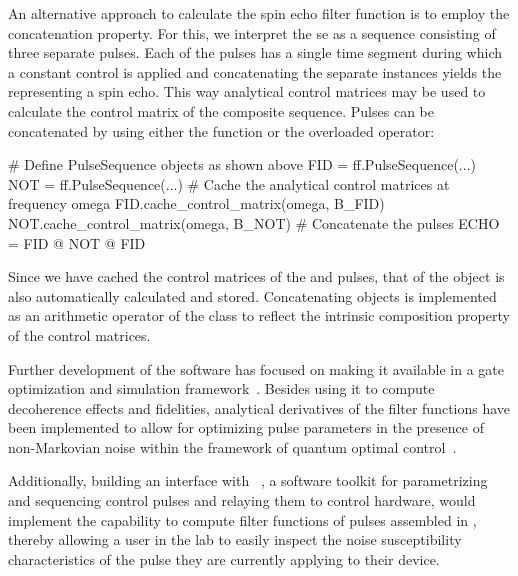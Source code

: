 An alternative approach to calculate the spin echo filter function is to employ the concatenation property.
For this, we interpret the \gls{se} as a sequence consisting of three separate pulses.
Each of the pulses has a single time segment during which a constant control is applied and concatenating the separate \pulsesequence instances yields the \pulsesequence representing a spin echo.
This way analytical control matrices may be used to calculate the control matrix of the composite sequence.
Pulses can be concatenated by using either the  function or the overloaded  operator:
\begin{pycode}
    # Define PulseSequence objects as shown above
    FID = ff.PulseSequence(...)
    NOT = ff.PulseSequence(...)
    # Cache the analytical control matrices at frequency omega
    FID.cache_control_matrix(omega, B_FID)
    NOT.cache_control_matrix(omega, B_NOT)
    # Concatenate the pulses
    ECHO = FID @ NOT @ FID
\end{pycode}
Since we have cached the control matrices of the  and  pulses, that of the  object is also automatically calculated and stored.
Concatenating \pulsesequence objects is implemented as an arithmetic operator of the class to reflect the intrinsic composition property of the control matrices.

Further development of the software has focused on making it available in a gate optimization and simulation framework~\cite{Teske2022a}.
Besides using it to compute decoherence effects and fidelities, analytical derivatives of the filter functions have been implemented to allow for optimizing pulse parameters in the presence of non-Markovian noise within the framework of quantum optimal control~\cite{Le2022,Teske2022}.

Additionally, building an interface with \qupulse~\cite{Humpohl2025,Humpohl2021}, a software toolkit for parametrizing and sequencing control pulses and relaying them to control hardware, would implement the capability to compute filter functions of pulses assembled in \qupulse, thereby allowing a user in the lab to easily inspect the noise susceptibility characteristics of the pulse they are currently applying to their device.
